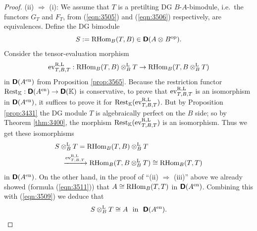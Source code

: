 \begin{proof}
\medskip \noindent
(ii) $\Rightarrow$ (i): 
We assume that $T$ is a pretilting DG $B$-$A$-bimodule, i.e.\ 
the functors $G_T$ and $F_T$, from (\ref{eqn:3505}) and
(\ref{eqn:3506}) respectively, are equivalences.
Define the DG bimodule 
\begin{equation} \label{eqn:3507}
S := \operatorname{RHom}_B(T, B) \in \boldsymbol{\mathsf{D}}(A \otimes_{} B^{\mathrm{op}}) .
\end{equation}
Consider the tensor-evaluation morphism 
\begin{equation} \label{eqn:3508}
\operatorname{ev}^{\mathrm{R, L}}_{T, B, T} : \operatorname{RHom}_B(T, B) 
\otimes^{\mathrm{L}}_{B} T \to 
\operatorname{RHom}_B(T, B \otimes^{\mathrm{L}}_{B} T)
\end{equation}
in $\boldsymbol{\mathsf{D}}(A^{\mathrm{en}})$ from  Proposition \ref{prop:3565}.
Because the restriction functor
$\opn{Rest}_{\K} : \lb \dcat{D}(A^{\mrm{en}}) \to \dcat{D}(\K)$
is conservative, to prove that $\operatorname{ev}^{\mathrm{R, L}}_{T, B, T}$ is an 
isomorphism in $\boldsymbol{\mathsf{D}}(A^{\mathrm{en}})$, it suffices 
to prove it for 
$\operatorname{Rest}_{\mathbb{K}}(\operatorname{ev}^{\mathrm{R, L}}_{T, B, T})$. 
But by Proposition \ref{prop:3431} the DG module $T$ is algebraically perfect 
on the $B$ side; so by Theorem \ref{thm:3400}, the morphism 
$\operatorname{Rest}_{\mathbb{K}}(\operatorname{ev}^{\mathrm{R, L}}_{T, B, T})$ is an isomorphism.
Thus we get these isomorphisms 
\begin{equation} \label{eqn:3509}
\begin{aligned}
& S \otimes^{\mathrm{L}}_{B} T = \operatorname{RHom}_B(T, B) \otimes^{\mathrm{L}}_{B} T
\\
& \quad \xrightarrow{\operatorname{ev}^{\mathrm{R, L}}_{T, B, T}}  
\operatorname{RHom}_B(T, B \otimes^{\mathrm{L}}_{B} T)
\cong \operatorname{RHom}_B(T, T) 
\end{aligned}
\end{equation}
in $\boldsymbol{\mathsf{D}}(A^{\mathrm{en}})$. 
On the other hand, in the proof of ``(ii) $\Rightarrow$ (iii)'' above we 
already showed (formula (\ref{eqn:3511})) that 
$A \cong \operatorname{RHom}_B(T, T)$ in $\boldsymbol{\mathsf{D}}(A^{\mathrm{en}})$. 
Combining this with (\ref{eqn:3509}) we deduce that 
\begin{equation} \label{eqn:3512}
S \otimes^{\mathrm{L}}_{B} T \cong A \ \ \textup{in} \ \ \boldsymbol{\mathsf{D}}(A^{\mathrm{en}}) . 
\end{equation}


\end{proof}
